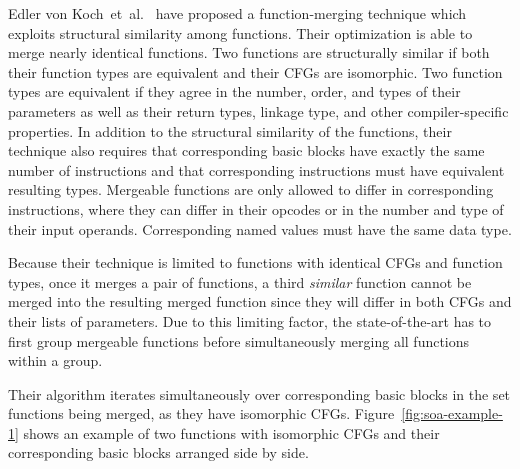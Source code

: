 Edler von Koch~et~al.~\cite{edler14} have proposed a function-merging technique which exploits structural similarity among functions.
Their optimization is able to merge nearly identical functions.
Two functions are structurally similar if both their function types are equivalent
and their CFGs are isomorphic.
Two function types are equivalent if they agree in the number, order, and types
of their parameters as well as
their return types, linkage type, and other compiler-specific properties.
In addition to the structural similarity of the functions, their technique also
requires that corresponding basic blocks have exactly the same number of instructions
and that corresponding instructions must have equivalent resulting types.
Mergeable functions are only allowed to differ in corresponding instructions,
where they can differ in their opcodes or in the number and type of their input operands.
Corresponding named values must have the same data type.



Because their technique is limited to functions with identical CFGs
and function types, once it merges a pair of functions, a third
\textit{similar} function cannot be merged into the resulting merged function
since they will differ in both CFGs and their lists of parameters.
Due to this limiting factor, the state-of-the-art has to first group
mergeable functions before simultaneously merging all functions within a group.

Their algorithm iterates simultaneously over corresponding basic
blocks in the set functions being merged, as they have isomorphic CFGs.
Figure~\ref{fig:soa-example-1} shows an example of two functions with isomorphic CFGs and their corresponding basic blocks arranged side by side.

